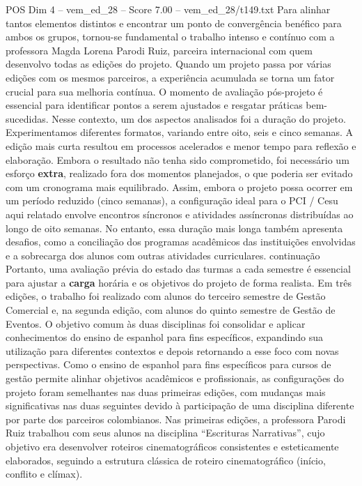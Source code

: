 \begin{textsample}{POS Dim 4 – vem\_ed\_28 – Score 7.00 – vem\_ed\_28/t149.txt}
Para alinhar tantos elementos distintos e encontrar um ponto de convergência benéfico para ambos os grupos, tornou-se fundamental o trabalho intenso e contínuo com a professora Magda Lorena Parodi Ruiz, parceira internacional com quem desenvolvo todas as edições do projeto.
Quando um projeto passa por várias edições com os mesmos parceiros, a experiência acumulada se torna um fator crucial para sua melhoria contínua.
O momento de avaliação pós-projeto é essencial para identificar pontos a serem ajustados e resgatar práticas bem-sucedidas.
Nesse contexto, um dos aspectos analisados foi a duração do projeto.
Experimentamos diferentes formatos, variando entre oito, seis e cinco semanas.
A edição mais curta resultou em processos acelerados e menor tempo para reflexão e elaboração.
Embora o resultado não tenha sido comprometido, foi necessário um esforço \textbf{extra}, realizado fora dos momentos planejados, o que poderia ser evitado com um cronograma mais equilibrado.
Assim, embora o projeto possa ocorrer em um período reduzido (cinco semanas), a configuração ideal para o PCI / Cesu aqui relatado envolve encontros síncronos e atividades assíncronas distribuídas ao longo de oito semanas.
No entanto, essa duração mais longa também apresenta desafios, como a conciliação dos programas acadêmicos das instituições envolvidas e a sobrecarga dos alunos com outras atividades curriculares. continuação Portanto, uma avaliação prévia do estado das turmas a cada semestre é essencial para ajustar a \textbf{carga} horária e os objetivos do projeto de forma realista.
Em três edições, o trabalho foi realizado com alunos do terceiro semestre de Gestão Comercial e, na segunda edição, com alunos do quinto semestre de Gestão de Eventos.
O objetivo comum às duas disciplinas foi consolidar e aplicar conhecimentos do ensino de espanhol para fins específicos, expandindo sua utilização para diferentes contextos e depois retornando a esse foco com novas perspectivas.
Como o ensino de espanhol para fins específicos para cursos de gestão permite alinhar objetivos acadêmicos e profissionais, as configurações do projeto foram semelhantes nas duas primeiras edições, com mudanças mais significativas nas duas seguintes devido à participação de uma disciplina diferente por parte dos parceiros colombianos.
Nas primeiras edições, a professora Parodi Ruiz trabalhou com seus alunos na disciplina “Escrituras Narrativas”, cujo objetivo era desenvolver roteiros cinematográficos consistentes e esteticamente elaborados, seguindo a estrutura clássica de roteiro cinematográfico (início, conflito e clímax).

\end{textsample}
